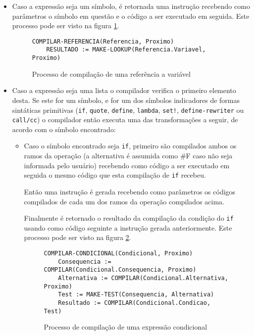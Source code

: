 \begin{itemize}

\item Caso a expressão seja um símbolo, é retornada uma instrução  
recebendo como parâmetros o símbolo em questão e o código a ser executado em
seguida. Este processo pode ser visto na figura \ref{fig:compile-lookup}.

\begin{figure}
\begin{lstlisting}
COMPILAR-REFERENCIA(Referencia, Proximo)
    RESULTADO := MAKE-LOOKUP(Referencia.Variavel, Proximo)
\end{lstlisting}
\caption{Processo de compilação de uma referência a variável}
\label{fig:compile-lookup}
\end{figure}

\item Caso a expressão seja uma lista o compilador verifica o primeiro elemento
desta. Se este for um símbolo, e for um dos símbolos indicadores de formas
sintáticas primitivas (\texttt{if}, \texttt{quote}, \texttt{define},
\texttt{lambda}, \texttt{set!}, \texttt{define-rewriter} ou \texttt{call/cc}) o 
compilador então executa uma das transformações a seguir, de acordo com o 
símbolo encontrado:
\begin{itemize}
 
 \item Caso o símbolo encontrado seja \texttt{if}, primeiro são compilados
 ambos os ramos da operação (a alternativa é assumida como \#F caso não seja
 informada pelo usuário) recebendo como código a ser executado em seguida o
 mesmo código que esta compilação de \texttt{if} recebeu. 
 
 Então uma instrução  é gerada recebendo como parâmetros os códigos
 compilados de cada um dos ramos da operação compilados acima. 
 
 Finalmente é
 retornado o resultado da compilação da condição do \texttt{if} usando como
 código seguinte a instrução  gerada anteriormente. Este processo
 pode ser visto na figura \ref{fig:compile-test}.  
 
\begin{figure}
\begin{lstlisting}
COMPILAR-CONDICIONAL(Condicional, Proximo)
    Consequencia := COMPILAR(Condicional.Consequencia, Proximo)
    Alternativa := COMPILAR(Condicional.Alternativa, Proximo)
    Test := MAKE-TEST(Consequencia, Alternativa)
    Resultado := COMPILAR(Condicional.Condicao, Test)
\end{lstlisting}
\caption{Processo de compilação de uma expressão condicional}
\label{fig:compile-test}
\end{figure}


\end{itemize}
\end{itemize}
